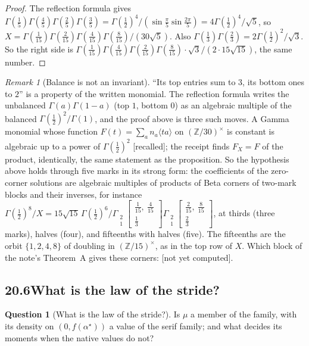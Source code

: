 \documentclass[11pt]{article}
\newcommand{\Gst}[4]{\Gamma_{\substack{#1\\#2}}\!\begin{bmatrix}#3\\#4\end{bmatrix}}
\theoremstyle{plain}
\theoremstyle{definition}
\newtheorem{question}[proposition]{Question}
\theoremstyle{remark}
\newtheorem{remark}[proposition]{Remark}
\newcommand{\recalled}{\textup{[recalled]}}
\newcommand{\notyet}{\textup{[not yet computed]}}
\begin{document}
\begin{proof}
The reflection formula gives $\Gamma(\frac15)\Gamma(\frac45)\Gamma(\frac25)\Gamma(\frac35)=\Gamma(\frac12)^4/(\sin\frac\pi5\sin\frac{2\pi}5)=4\Gamma(\frac12)^4/\sqrt5$, so $X=\Gamma(\frac1{15})\Gamma(\frac2{15})\Gamma(\frac4{15})\Gamma(\frac8{15})/(30\sqrt5)$. Also $\Gamma(\frac13)\Gamma(\frac23)=2\Gamma(\frac12)^2/\sqrt3$. So the right side is $\Gamma(\frac1{15})\Gamma(\frac4{15})\Gamma(\frac2{15})\Gamma(\frac8{15})\cdot\sqrt3/(2\cdot15\sqrt{15})$, the same number.
\end{proof}

\begin{remark}[Balance is not an invariant]\label{c:r:balance}
``Its top entries sum to $3$, its bottom ones to $2$'' is a property of the written monomial. The reflection formula writes the unbalanced $\Gamma(a)\Gamma(1-a)$ (top $1$, bottom $0$) as an algebraic multiple of the balanced $\Gamma(\frac12)^2/\Gamma(1)$, and the proof above is three such moves. A Gamma monomial whose function $F(t)=\sum_an_a\langle ta\rangle$ on $(\mathbb Z/30)^\times$ is constant is algebraic up to a power of $\Gamma(\frac12)^2$ \recalled; the receipt finds $F_X=F$ of the product, identically, the same statement as the proposition. So the hypothesis above holds through five marks in its strong form: the coefficients of the zero-corner solutions are algebraic multiples of products of Beta corners of two-mark blocks and their inverses, for instance $\Gamma(\frac12)^8/X=15\sqrt{15}\,\Gamma(\frac12)^6\big/\Gst21{\frac1{15},\ \frac4{15}}{\frac13}\Gst21{\frac2{15},\ \frac8{15}}{\frac23}$, at thirds (three marks), halves (four), and fifteenths with halves (five). The fifteenths are the orbit $\{1,2,4,8\}$ of doubling in $(\mathbb Z/15)^\times$, as in the top row of $X$. Which block of the note's Theorem~A gives these corners: \notyet.
\end{remark}

\subsection*{20.6\quad What is the law of the stride?}

\begin{question}[What is the law of the stride?]\label{a:q:stride}
Is $\mu$ a member of the family, with its density on $(0,f(\alpha^\star))$ a value of the serif family; and what decides its moments when the native values do not?
\end{question}
\end{document}
